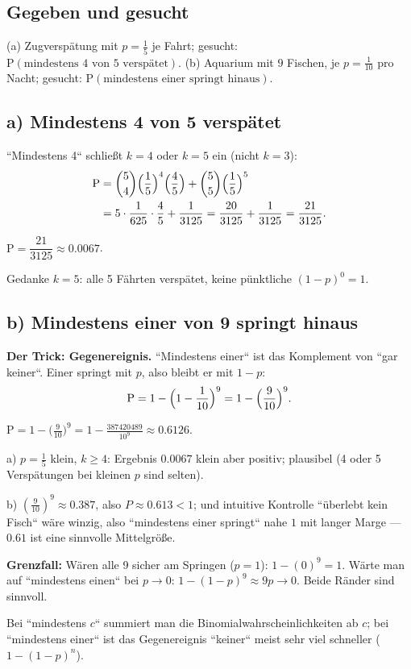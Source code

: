 

\subsection*{Gegeben und gesucht}
(a) Zugversp\"atung mit $p=\tfrac15$ je Fahrt; gesucht:
$\mathrm P(\text{mindestens 4 von 5 versp\"atet})$.
(b) Aquarium mit $9$ Fischen, je $p=\tfrac1{10}$ pro Nacht;
gesucht: $\mathrm P(\text{mindestens einer springt hinaus})$.

\subsection*{a) Mindestens 4 von 5 versp\"atet}
``Mindestens 4`` schlie\ss{}t $k=4$ oder $k=5$ ein (nicht $k=3$):
\begin{align}
  \mathrm P &= \binom54\Bigl(\frac15\Bigr)^4\Bigl(\frac45\Bigr)
     +\binom55\Bigl(\frac15\Bigr)^5 \\
  &=5\cdot\frac{1}{625}\cdot\frac45+\frac1{3125}
   =\frac{20}{3125}+\frac1{3125}=\frac{21}{3125}.
\end{align}
\begin{ergebnis}
$\mathrm P=\dfrac{21}{3125}\approx0.0067$.
\end{ergebnis}
Gedanke $k=5$: alle 5 F\"ahrten versp\"atet, keine pünktliche
$(1-p)^0=1$.

\subsection*{b) Mindestens einer von 9 springt hinaus}
\textbf{Der Trick: Gegenereignis.} ``Mindestens einer`` ist das
Komplement von ``gar keiner``. Einer springt mit $p$, also bleibt er mit
$1-p$:
\begin{equation}
  \mathrm P=1-\Bigl(1-\frac1{10}\Bigr)^9
  =1-\Bigl(\frac9{10}\Bigr)^9 .
\end{equation}
\begin{ergebnis}
$\mathrm P=1-\bigl(\tfrac9{10}\bigr)^9
=1-\tfrac{387420489}{10^9}\approx0.6126$.
\end{ergebnis}

\begin{kontrolle}
a) $p=\tfrac15$ klein, $k\ge4$: Ergebnis $0.0067$ klein aber positiv;
plausibel (4 oder 5 Versp\"atungen bei kleinen $p$ sind selten).

b) $(\tfrac9{10})^9\approx0.387$, also $P\approx0.613<1$; und intuitive
Kontrolle ``überlebt kein Fisch`` wäre winzig, also ``mindestens einer
springt`` nahe $1$ mit langer Marge --- $0.61$ ist eine sinnvolle
Mittelgr\"o\ss{}e.

\textbf{Grenzfall:} W\"aren alle 9 sicher am Springen ($p=1$): $1-(0)^9=1$.
W\"arte man auf ``mindestens einen`` bei $p\to0$: $1-(1-p)^9\approx9p\to0$.
Beide R\"ander sind sinnvoll.
\end{kontrolle}

\begin{merksatz}
Bei ``mindestens $c$`` summiert man die Binomialwahrscheinlichkeiten ab
$c$; bei ``mindestens einer`` ist das Gegenereignis ``keiner`` meist
sehr viel schneller ($1-(1-p)^n$).
\end{merksatz}
